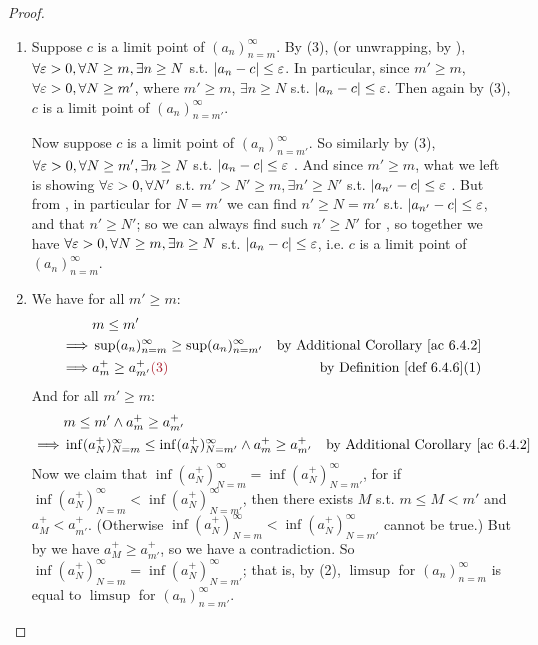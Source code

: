 \begin{proof}
\begin{enumerate}
\item
Suppose \(c\) is a limit point of \((a_n)_{n = m}^{\infty}\).
By (3), (or unwrapping, by ), \(\forall \varepsilon > 0, \forall N \ge m, \exists n \ge N\) s.t. \(\lvert a_n - c\rvert \le \varepsilon\).
In particular, since \(m' \ge m\),\(\forall \varepsilon > 0, \forall N \ge m'\), where \(m' \ge m\), \(\exists n \ge N\) s.t. \(\lvert a_n - c\rvert \le \varepsilon\).
Then again by (3), \(c\) is a limit point of \((a_n)_{n = m'}^{\infty}\).

Now suppose \(c\) is a limit point of \((a_n)_{n = m'}^{\infty}\).
So similarly by (3), \(\forall \varepsilon > 0, \forall N \ge m', \exists n \ge N\) s.t. \(\lvert a_n - c\rvert \le \varepsilon\) .
And since \(m' \ge m\), what we left is showing \(\forall \varepsilon > 0, \forall N'\) s.t. \(m' > N' \ge m, \exists n' \ge N'\) s.t. \(\lvert a_{n'} - c\rvert \le \varepsilon\) .
But from , in particular for \(N = m'\) we can find \(n' \ge N = m'\) s.t. \(\lvert a_{n'} - c\rvert \le \varepsilon\), and that \(n' \ge N'\);
so we can always find such \(n' \ge N'\) for , so together we have \(\forall \varepsilon > 0, \forall N \ge m, \exists n \ge N\) s.t. \(\lvert a_n - c\rvert \le \varepsilon\), i.e. \(c\) is a limit point of \((a_n)_{n = m}^{\infty}\).

\item
We have for all \(m' \ge m\):
\begin{align*}
             & m \le m' \\
    \implies & \sup(a_n)_{n = m}^{\infty} \ge \sup(a_n)_{n = m'}^{\infty} & \text{by \AC{6.4.2}} \\
    \implies & a_m^+ \ge a_{m'}^+ \MAROON{(3)} & \text{by \DEF{6.4.6}(1)}
\end{align*}
And for all \(m' \ge m\):
\begin{align*}
             & m \le m' \land a_m^+ \ge a_{m'}^+ \\
    \implies & \inf(a_N^+)_{N = m}^{\infty} \le \inf(a_N^+)_{N = m'}^{\infty} \land a_m^+ \ge a_{m'}^+ & \text{by \AC{6.4.2}}
\end{align*}
Now we claim that \(\inf(a_N^+)_{N = m}^{\infty} = \inf(a_N^+)_{N = m'}^{\infty}\),
for if \(\inf(a_N^+)_{N = m}^{\infty} < \inf(a_N^+)_{N = m'}^{\infty}\), then there exists \(M\) s.t. \(m \le M < m'\) and \(a_M^+ < a_{m'}^+\).
(Otherwise \(\inf(a_N^+)_{N = m}^{\infty} < \inf(a_N^+)_{N = m'}^{\infty}\) cannot be true.)
But by  we have \(a_M^+ \ge a_{m'}^+\), so we have a contradiction.
So \(\inf(a_N^+)_{N = m}^{\infty} = \inf(a_N^+)_{N = m'}^{\infty}\);
that is, by (2), \(\limsup\) for \((a_n)_{n = m}^{\infty}\) is equal to \(\limsup\) for \((a_n)_{n = m'}^{\infty}\).


\end{enumerate}
\end{proof}
